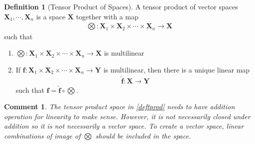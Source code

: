 \documentclass[letterpaper,12pt]{article}
\theoremstyle{plain}
\theoremstyle{plain}
\newtheorem*{cmnt*}{Comment}
\theoremstyle{definition}
\newtheorem{defn}{Definition}
\begin{document}
\begin{defn}[Tensor Product of Spaces]\label{deftprod}
A tensor product of vector spaces $\mathbf{X}_1,\cdots,\mathbf{X}_n$ is a space $\mathbf{X}$ together with a map\index{$\bigotimes$}
\begin{align*}
\bigotimes:\mathbf{X}_1 \times \mathbf{X}_2 \times \cdots \times \mathbf{X}_n \rightarrow \mathbf{X}
\end{align*}
such that
\begin{enumerate}
\item $\bigotimes:\mathbf{X}_1 \times \mathbf{X}_2 \times \cdots \times \mathbf{X}_n \rightarrow \mathbf{X}$ is multilinear
\item If $\mathbf{f}:\mathbf{X}_1 \times \mathbf{X}_2 \times \cdots \times \mathbf{X}_n \rightarrow \mathbf{Y}$ is multilinear, then there is a unique linear map
\begin{align*}
\hat{\mathbf{f}}:\mathbf{X} \rightarrow \mathbf{Y}
\end{align*}
such that $\mathbf{f} = \hat{\mathbf{f}} \circ \bigotimes$.
\end{enumerate}
\end{defn}

\begin{cmnt*}
The tensor product space in \autoref{deftprod} needs to have addition operation for linearity to make sense. However, it is not necessarily closed under addition so it is not necessarily a vector space. To create a vector space, linear combinations of image of $\bigotimes$ should be included in the space.
\end{cmnt*}
\end{document}
